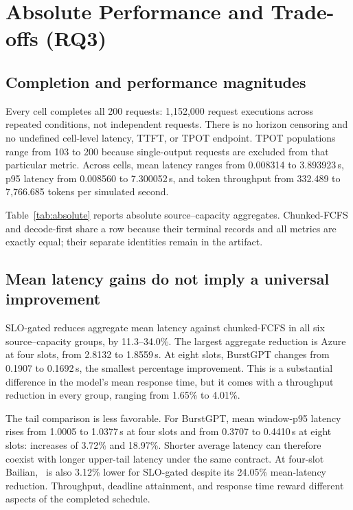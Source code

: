 \section{Absolute Performance and Trade-offs (RQ3)}\label{sec:performance}
\subsection{Completion and performance magnitudes}
Every cell completes all 200 requests: 1,152,000 request executions across
repeated conditions, not independent requests. There is no horizon censoring
and no undefined cell-level latency, TTFT, or TPOT endpoint. TPOT populations
range from 103 to 200 because single-output requests are excluded from that
particular metric. Across cells, mean latency ranges from 0.008314 to
3.893923\,s, p95 latency from 0.008560 to 7.300052\,s, and token throughput
from 332.489 to 7,766.685 tokens per simulated second.

Table~\ref{tab:absolute} reports absolute source--capacity aggregates.
Chunked-FCFS and decode-first share a row because their terminal records
and all metrics are exactly equal; their separate identities remain in the artifact.

\begin{table}[t]
\centering\small\setlength{\tabcolsep}{4pt}
\caption{Absolute performance, equally averaging six settings within each
window and 40 windows within each source. ``Slots'' are effective full-context
residents. Mean and p95 columns are mean latency and \emph{mean window-level
p95 latency}; throughput is output tokens per simulated second.}
\label{tab:absolute}
\end{table}

\subsection{Mean latency gains do not imply a universal improvement}
SLO-gated reduces aggregate mean latency against chunked-FCFS in all six
source--capacity groups, by 11.3--34.0\%. The largest aggregate reduction is
Azure at four slots, from 2.8132 to 1.8559\,s. At eight slots, BurstGPT changes
from 0.1907 to 0.1692\,s, the smallest percentage improvement. This is a
substantial difference in the model's mean response time, but it comes
with a throughput reduction in every group, ranging from 1.65\% to 4.01\%.

The tail comparison is less favorable. For BurstGPT, mean window-p95 latency
rises from 1.0005 to 1.0377\,s at four slots and from 0.3707 to 0.4410\,s at
eight slots: increases of 3.72\% and 18.97\%. Shorter average latency can
therefore coexist with longer upper-tail latency under the same contract.
At four-slot Bailian, \anwg\ is also 3.12\% lower for SLO-gated despite its
24.05\% mean-latency reduction. Throughput, deadline attainment, and response
time reward different aspects of the completed schedule.

